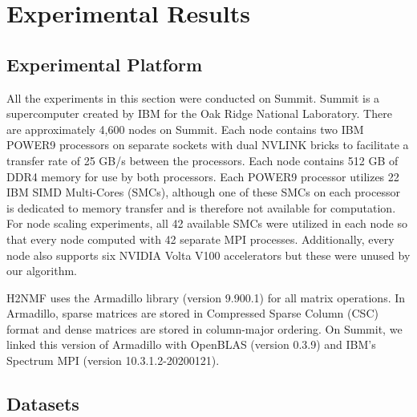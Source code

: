 \documentclass[conference,compsoc]{IEEEtran}
\begin{document}
\section{Experimental Results}

\subsection{Experimental Platform}
All the experiments in this section were conducted on Summit. Summit is a supercomputer created by IBM for the Oak Ridge National Laboratory. 
There are approximately 4,600 nodes on Summit. Each node contains two IBM POWER9 processors on separate sockets with dual NVLINK bricks to facilitate a transfer rate of 
25 GB/s between the processors. Each node contains 512 GB of DDR4 memory for use by both processors. Each POWER9 processor utilizes 22 IBM SIMD Multi-Cores (SMCs), 
although one of these SMCs on each processor is dedicated to memory transfer and is therefore not available for computation. 
For node scaling experiments, all 42 available SMCs were utilized in each node so that every node computed with 42 separate MPI processes.
Additionally, every node also supports six NVIDIA Volta V100 accelerators but these were unused by our algorithm. 

H2NMF uses the Armadillo library (version 9.900.1) for all matrix operations. 
In Armadillo, sparse matrices are stored in Compressed Sparse Column (CSC) format and dense matrices are stored in column-major ordering.
On Summit, we linked this version of Armadillo with OpenBLAS (version 0.3.9) and IBM's Spectrum MPI (version 10.3.1.2-20200121).


\subsection{Datasets}
\end{document}
